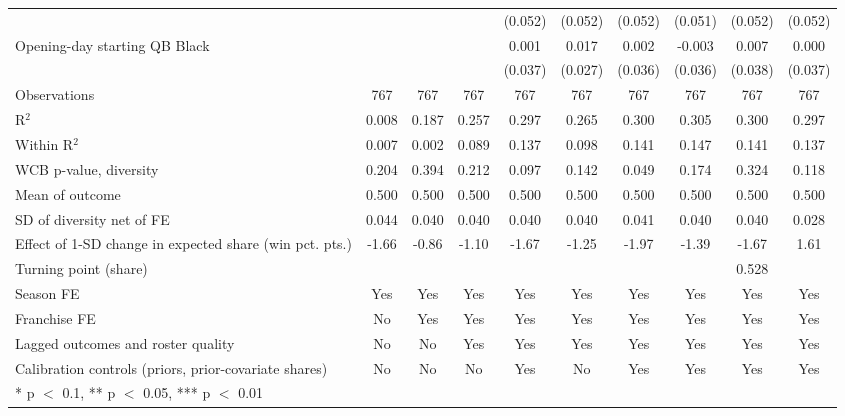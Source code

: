 \begin{table}[H]
{\begin{tabular}[t]{lccccccccc}
 &  &  &  & (0.052) & (0.052) & (0.052) & (0.051) & (0.052) & (0.052)\\
Opening-day starting QB Black &  &  &  & 0.001 & 0.017 & 0.002 & -0.003 & 0.007 & 0.000\\
 &  &  &  & (0.037) & (0.027) & (0.036) & (0.036) & (0.038) & (0.037)\\
\midrule
Observations & 767 & 767 & 767 & 767 & 767 & 767 & 767 & 767 & 767\\
R$^2$ & 0.008 & 0.187 & 0.257 & 0.297 & 0.265 & 0.300 & 0.305 & 0.300 & 0.297\\
Within R$^2$ & 0.007 & 0.002 & 0.089 & 0.137 & 0.098 & 0.141 & 0.147 & 0.141 & 0.137\\
WCB p-value, diversity & 0.204 & 0.394 & 0.212 & 0.097 & 0.142 & 0.049 & 0.174 & 0.324 & 0.118\\
Mean of outcome & 0.500 & 0.500 & 0.500 & 0.500 & 0.500 & 0.500 & 0.500 & 0.500 & 0.500\\
SD of diversity net of FE & 0.044 & 0.040 & 0.040 & 0.040 & 0.040 & 0.041 & 0.040 & 0.040 & 0.028\\
Effect of 1-SD change in expected share (win pct. pts.) & -1.66 & -0.86 & -1.10 & -1.67 & -1.25 & -1.97 & -1.39 & -1.67 & 1.61\\
Turning point (share) &  &  &  &  &  &  &  & 0.528 & \\
Season FE & Yes & Yes & Yes & Yes & Yes & Yes & Yes & Yes & Yes\\
Franchise FE & No & Yes & Yes & Yes & Yes & Yes & Yes & Yes & Yes\\
Lagged outcomes and roster quality & No & No & Yes & Yes & Yes & Yes & Yes & Yes & Yes\\
Calibration controls (priors, prior-covariate shares) & No & No & No & Yes & No & Yes & Yes & Yes & Yes\\
\bottomrule
\multicolumn{10}{l}{\rule{0pt}{1em}* p $<$ 0.1, ** p $<$ 0.05, *** p $<$ 0.01}\\
\end{tabular}}
\end{table}

